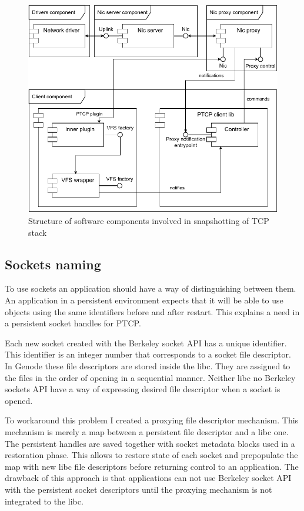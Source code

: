 \begin{figure}
    \centering
    \includegraphics[]{figs/tracking_tcp_stack.pdf}
    \caption{Structure of software components involved in snapshotting of TCP stack}
    \label{fig:track_components}
\end{figure}

\subsection{Sockets naming}

To use sockets an application should have a way of distinguishing between them.
An application in a persistent environment expects that it will be able to use
objects using the same identifiers before and after restart. This explains a
need in a persistent socket handles for PTCP.

Each new socket created with the Berkeley socket API has a unique identifier.
This identifier is an integer number that corresponds to a socket file
descriptor. In Genode these file descriptors are stored inside the libc. They
are assigned to the files in the order of opening in a sequential manner.
Neither libc no Berkeley sockets API have a way of expressing desired file
descriptor when a socket is opened.

To workaround this problem I created a proxying file descriptor mechanism. This
mechanism is merely a map between a persistent file descriptor and a libc one.
The persistent handles are saved together with socket metadata blocks used in a
restoration phase. This allows to restore state of each socket and prepopulate
the map with new libc file descriptors before returning control to an
application. The drawback of this approach is that applications can not use
Berkeley socket API with the persistent socket descriptors until the proxying
mechanism is not integrated to the libc.

